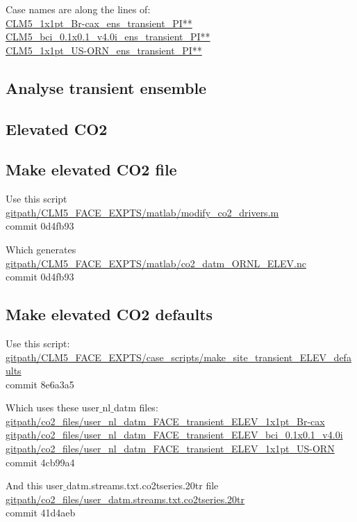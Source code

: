 \documentclass{article}
\begin{document}
Case names are along the lines of:\\
{\color{cyan}\small{\url{CLM5_1x1pt_Br-cax_ens_transient_PI**}}}\\
{\color{cyan}\small{\url{CLM5_bci_0.1x0.1_v4.0i_ens_transient_PI**}}}\\
{\color{cyan}\small{\url{CLM5_1x1pt_US-ORN_ens_transient_PI**}}}

\subsection{Analyse transient ensemble}

\subsection{Elevated CO2}
\subsection{Make elevated CO2 file}
Use this script\\
{\color{blue}\small{\url{gitpath/CLM5_FACE_EXPTS/matlab/modify_co2_drivers.m}}}\\
commit 0d4fb93

Which generates\\
{\color{red}\small{\url{gitpath/CLM5_FACE_EXPTS/matlab/co2_datm_ORNL_ELEV.nc}}}\\
commit 0d4fb93  

\subsection{Make elevated CO2 defaults}
Use this script:\\
{\color{blue}\small{\url{gitpath/CLM5_FACE_EXPTS/case_scripts/make_site_transient_ELEV_defaults}}}\\
commit 8e6a3a5    


Which uses these user$\_$nl$\_$datm files:\\
{\color{blue}\small{\url{gitpath/co2_files/user_nl_datm_FACE_transient_ELEV_1x1pt_Br-cax}}}\\
{\color{blue}\small{\url{gitpath/co2_files/user_nl_datm_FACE_transient_ELEV_bci_0.1x0.1_v4.0i}}}\\
{\color{blue}\small{\url{gitpath/co2_files/user_nl_datm_FACE_transient_ELEV_1x1pt_US-ORN}}}\\
commit 4cb99a4

And this user$\_$datm.streams.txt.co2tseries.20tr file\\
{\color{blue}\small{\url{gitpath/co2_files/user_datm.streams.txt.co2tseries.20tr}}}\\
commit 41d4aeb  
\end{document}
